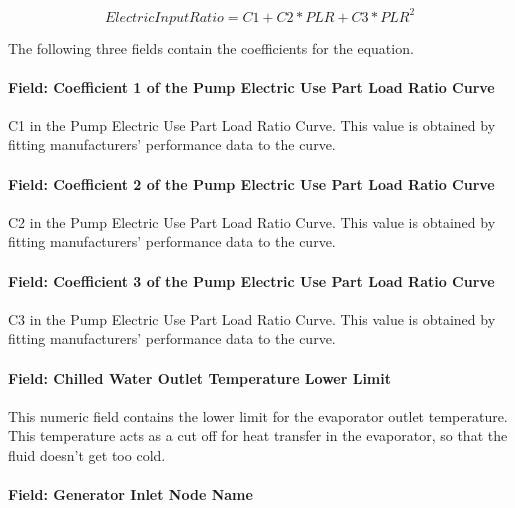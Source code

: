 \begin{equation}
    ElectricInputRatio = C1 + C2 * PLR + C3 * PL{R^2}
\end{equation}

The following three fields contain the coefficients for the equation.

\paragraph{Field: Coefficient 1 of the Pump Electric Use Part Load Ratio Curve}\label{field-coefficient-1-of-the-pump-electric-use-part-load-ratio-curve}

C1 in the Pump Electric Use Part Load Ratio Curve. This value is obtained by fitting manufacturers' performance data to the curve.

\paragraph{Field: Coefficient 2 of the Pump Electric Use Part Load Ratio Curve}\label{field-coefficient-2-of-the-pump-electric-use-part-load-ratio-curve}

C2 in the Pump Electric Use Part Load Ratio Curve. This value is obtained by fitting manufacturers' performance data to the curve.

\paragraph{Field: Coefficient 3 of the Pump Electric Use Part Load Ratio Curve}\label{field-coefficient-3-of-the-pump-electric-use-part-load-ratio-curve}

C3 in the Pump Electric Use Part Load Ratio Curve. This value is obtained by fitting manufacturers' performance data to the curve.

\paragraph{Field: Chilled Water Outlet Temperature Lower Limit}\label{field-chilled-water-outlet-temperature-lower-limit}

This numeric field contains the lower limit for the evaporator outlet temperature. This temperature acts as a cut off for heat transfer in the evaporator, so that the fluid doesn't get too cold.

\paragraph{Field: Generator Inlet Node Name}\label{field-generator-inlet-node-name}

